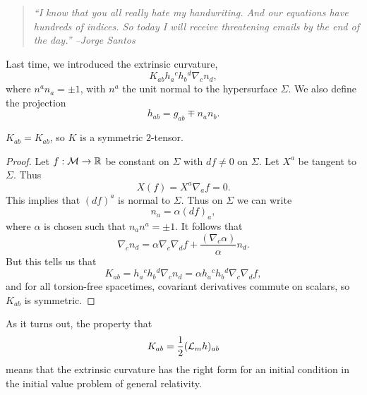 \begin{quote}
    \textit{``I know that you all really hate my handwriting. And our equations have hundreds of indices. So today I will receive threatening emails by the end of the day.'' --Jorge Santos}
\end{quote}

Last time, we introduced the extrinsic curvature,
\begin{equation}
    K_{ab} h_a{}^c h_b{}^d \nabla_c n_d,
\end{equation}
where $n^a n_a= \pm1$, with $n^a$ the unit normal to the hypersurface $\Sigma$. We also define the projection
\begin{equation}
    h_{ab}=g_{ab} \mp n_a n_b.
\end{equation}
\begin{lem}
    $K_{ab}=K_{ab}$, so $K$ is a symmetric $2$-tensor.
\end{lem}
\begin{proof}
    Let $f:\mathcal{M} \to \mathbb{R}$ be constant on $\Sigma$ with $df\neq 0$ on $\Sigma$. Let $X^a$ be tangent to $\Sigma$. Thus
    \begin{equation}
        X(f)=X^a \nabla_a f=0.
    \end{equation}
    This implies that $(df)^a$ is normal to $\Sigma$.
    Thus on $\Sigma$ we can write
    \begin{equation}
        n_a = \alpha(df)_{a},
    \end{equation}
    where $\alpha$ is chosen such that $n_a n^a = \pm 1$. It follows that
    \begin{equation}
        \nabla_c n_d = \alpha \nabla_c \nabla_d f +\frac{(\nabla_c \alpha)}{\alpha} n_d.
    \end{equation}
    But this tells us that
    \begin{equation}
        K_{ab}=h_a{}^c h_b{}^d \nabla_c n_d = \alpha h_a{}^c h_b{}^d \nabla_c \nabla_d f,
    \end{equation}
    and for all torsion-free spacetimes, covariant derivatives commute on scalars, so $K_{ab}$ is symmetric.
\end{proof}

As it turns out, the property that
\begin{equation}
    K_{ab}=\frac{1}{2}(\mathcal L_m h)_{ab}
\end{equation}
means that the extrinsic curvature has the right form for an initial condition in the initial value problem of general relativity.

